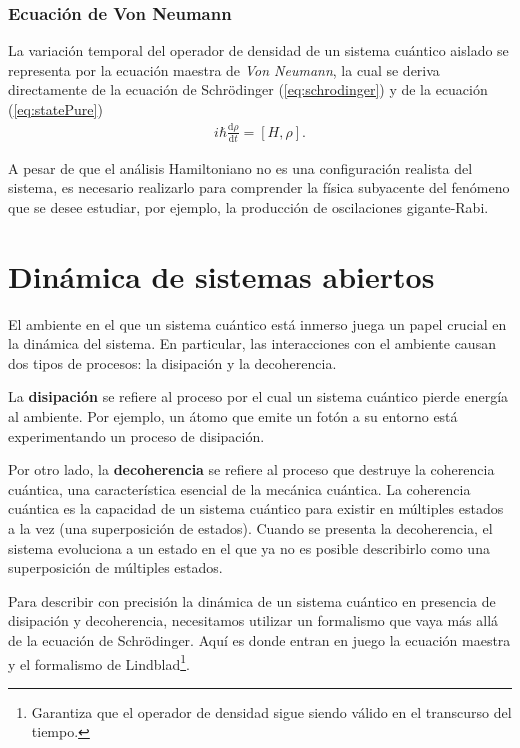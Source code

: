 \documentclass[main.tex]{subfiles}
\begin{document}
\subsubsection{Ecuación de Von Neumann}
La variación temporal del operador de densidad de un sistema cuántico aislado se representa por la ecuación maestra de \textit{Von Neumann}, la cual se deriva directamente de la ecuación de Schrödinger (\ref{eq:schrodinger}) y de la ecuación (\ref{eq:statePure})
\begin{align}\label{eq:neumann}
	i \hbar \frac{\mathrm{d} \rho}{\mathrm{d} t} = [H,\rho].
\end{align}

A pesar de que el análisis Hamiltoniano no es una configuración realista del sistema, es necesario realizarlo para comprender la física subyacente del fenómeno que se desee estudiar, por ejemplo, la producción de oscilaciones gigante-Rabi.

\section{Dinámica de sistemas abiertos}
El ambiente en el que un sistema cuántico está inmerso juega un papel crucial en la dinámica del sistema. En particular, las interacciones con el ambiente causan dos tipos de procesos: la disipación y la decoherencia. 

La \textbf{disipación} se refiere al proceso por el cual un sistema cuántico pierde energía al ambiente. Por ejemplo, un átomo que emite un fotón a su entorno está experimentando un proceso de disipación. 

Por otro lado, la \textbf{decoherencia} se refiere al proceso que destruye la coherencia cuántica, una característica esencial de la mecánica cuántica. La coherencia cuántica es la capacidad de un sistema cuántico para existir en múltiples estados a la vez (una superposición de estados). Cuando se presenta la decoherencia, el sistema evoluciona a un estado en el que ya no es posible describirlo como una superposición de múltiples estados.

Para describir con precisión la dinámica de un sistema cuántico en presencia de disipación y decoherencia, necesitamos utilizar un formalismo que vaya más allá de la ecuación de Schrödinger. Aquí es donde entran en juego la ecuación maestra y el formalismo de Lindblad\footnote{Garantiza que el operador de densidad sigue siendo válido en el transcurso del tiempo.}.
\end{document}
